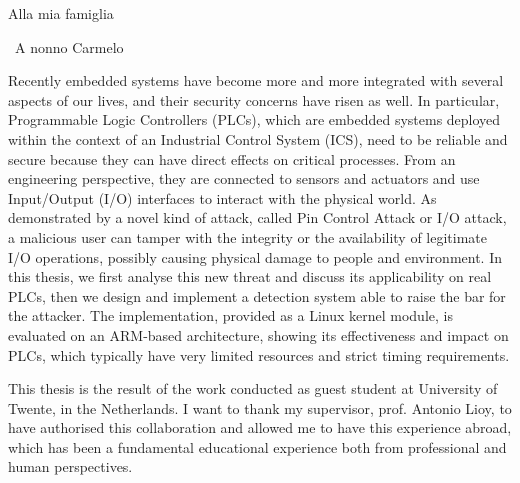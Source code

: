 \documentclass[pdfa,cucitura]{toptesi}
\begin{document}

\TesiDiLaurea{}










\frontespizio
\paginavuota
\newpage

\advance\voffset -5mm
\advance\textheight 30mm


\begin{dedica}
Alla mia famiglia

\textdagger\ A nonno Carmelo
\end{dedica}


\sommario

Recently embedded systems have become more and more integrated with several aspects of our lives, and their security concerns have risen as well.
In particular, Programmable Logic Controllers (PLCs), which are embedded systems deployed within the context of an Industrial Control System (ICS),
need to be reliable and secure because they can have direct effects on critical processes.
From an engineering perspective, they are connected to sensors and actuators and use Input/Output (I/O) interfaces to interact with the physical world.
As demonstrated by a novel kind of attack, called Pin Control Attack or I/O attack, a malicious user can tamper with the integrity or
the availability of legitimate I/O operations, possibly causing physical damage to people and environment.
In this thesis, we first analyse this new threat and discuss its applicability on real PLCs, then we design and implement a detection system able to raise the bar for the attacker.
The implementation, provided as a Linux kernel module, is evaluated on an ARM-based architecture,
showing its effectiveness and impact on PLCs, which typically have very limited resources and strict timing requirements.


\ringraziamenti

This thesis is the result of the work conducted as guest student at University of Twente, in the Netherlands. I want to thank my supervisor, prof. Antonio Lioy,
to have authorised this collaboration and allowed me to have this experience abroad, which has been a fundamental educational experience both from professional and human perspectives.
\end{document}
